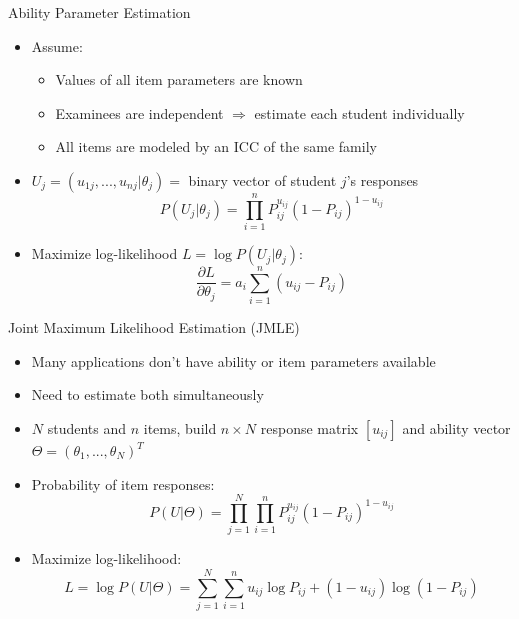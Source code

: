 \documentclass{beamer}
\theoremstyle{definition}
\begin{document}
\begin{frame}{Ability Parameter Estimation}
\begin{itemize}
  \item Assume:
  \begin{itemize}
    \item Values of all item parameters are known
    \item Examinees are independent $\Rightarrow$ estimate each student individually
    \item All items are modeled by an ICC of the same family
  \end{itemize}
  \item<2-> $U_j = (u_{1j},...,u_{nj} |\theta_j) = $ binary vector of student $j$'s responses
  \[P(U_j | \theta_j) = \prod_{i=1}^n P_{ij}^{u_{ij}} (1-P_{ij})^{1-u_{ij}}\]
  \item<3> Maximize log-likelihood $L = \log P(U_j| \theta_j)$:
  \[\frac{\partial L}{\partial \theta_j} = a_i \sum_{i=1}^n (u_{ij}- P_{ij})\]
\end{itemize}
\end{frame}

\begin{frame}{Joint Maximum Likelihood Estimation (JMLE)}
\begin{itemize}
  \item Many applications don't have ability or item parameters available
  \item Need to estimate both simultaneously
  \item<2-> $N$ students and $n$ items, build $n\times N$ response matrix $[u_{ij}]$ and ability vector $\Theta = (\theta_1,...,\theta_N)^T$
  \item<2-> Probability of item responses:
  \[P(U|\Theta) = \prod_{j=1}^N \prod_{i=1}^n P_{ij}^{u_{ij}} (1-P_{ij})^{1-u_{ij}}\]
  \item<3> Maximize log-likelihood:
  \[L = \log P(U|\Theta) = \sum_{j=1}^N \sum_{i=1}^n u_{ij} \log P_{ij}  + (1-u_{ij}) \log (1-P_{ij})\]
\end{itemize}
\end{frame}
\end{document}
